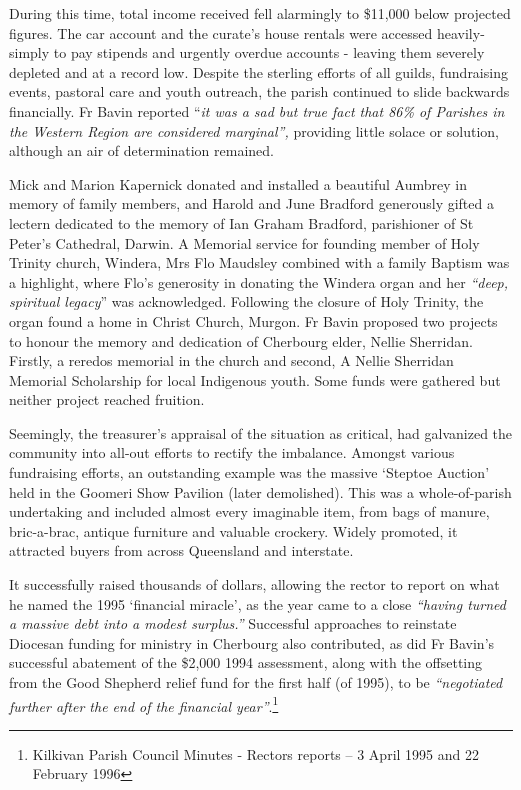 During this time, total income received fell alarmingly to \$11,000 below projected figures. The car account and the curate's house rentals were accessed heavily- simply to pay stipends and urgently overdue accounts - leaving them severely depleted and at a record low. Despite the sterling efforts of all guilds, fundraising events, pastoral care and youth outreach, the parish continued to slide backwards financially. Fr Bavin reported ``\emph{it was a sad but true fact that 86\% of Parishes in the Western Region are considered marginal'',} providing little solace or solution, although an air of determination remained.



Mick and Marion Kapernick donated and installed a beautiful Aumbrey in memory of family members, and Harold and June Bradford generously gifted a lectern dedicated to the memory of Ian Graham Bradford, parishioner of St Peter's Cathedral, Darwin. A Memorial service for founding member of Holy Trinity church, Windera, Mrs Flo Maudsley combined with a family Baptism was a highlight, where Flo's generosity in donating the Windera organ and her \emph{``deep, spiritual legacy}'' was acknowledged. Following the closure of Holy Trinity, the organ found a home in Christ Church, Murgon. Fr Bavin proposed two projects to honour the memory and dedication of Cherbourg elder, Nellie Sherridan. Firstly, a reredos memorial in the church and second, A Nellie Sherridan Memorial Scholarship for local Indigenous youth. Some funds were gathered but neither project reached fruition.



Seemingly, the treasurer's appraisal of the situation as critical, had galvanized the community into all-out efforts to rectify the imbalance. Amongst various fundraising efforts, an outstanding example was the massive `Steptoe Auction' held in the Goomeri Show Pavilion (later demolished). This was a whole-of-parish undertaking and included almost every imaginable item, from bags of manure, bric-a-brac, antique furniture and valuable crockery. Widely promoted, it attracted buyers from across Queensland and interstate.



It successfully raised thousands of dollars, allowing the rector to report on what he named the 1995 `financial miracle', as the year came to a close \emph{``having turned a massive debt into a modest surplus.''} Successful approaches to reinstate Diocesan funding for ministry in Cherbourg also contributed, as did Fr Bavin's successful abatement of the \$2,000 1994 assessment, along with the offsetting from the Good Shepherd relief fund for the first half (of 1995), to be \emph{``negotiated further after the end of the financial year''}.\footnote{Kilkivan Parish Council Minutes - Rectors reports -- 3 April 1995 and 22 February 1996}








